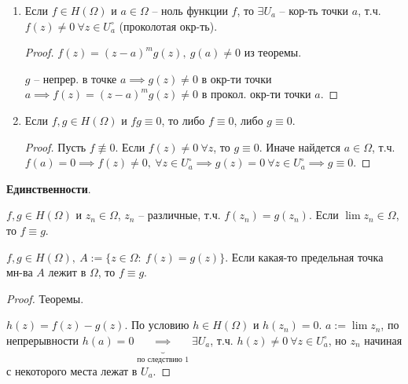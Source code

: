 \begin{consequence}
    \begin{enumerate}
        \item {
            Если $f \in H(\Omega)$ и $a \in \Omega$ -- ноль функции $f$, то $\exists U_a$ -- кор-ть точки $a$, т.ч. $f(z) \not = 0 \ \forall z \in U^{\circ}_a$ (проколотая окр-ть).

            \begin{proof}
                $f(z) = (z - a)^m g(z), \ g(a) \not = 0$ из теоремы.

                $g$ -- непрер. в точке $a \implies g(z) \not = 0$ в окр-ти точки $a \implies f(z) = (z - a)^m g(z) \not = 0$ в прокол. окр-ти точки $a$.
            \end{proof}
        }
        \item {
            Если $f, g \in H(\Omega)$ и $f g \equiv 0$, то либо $f \equiv 0$, либо $g \equiv 0$.

            \begin{proof}
                Пусть $f \not \equiv 0$. Если $f(z) \not = 0 \ \forall z$, то $g \equiv 0$. Иначе найдется $a \in \Omega$, т.ч. $f(a) = 0 \implies f(z) \not = 0, \ \forall z \in U^{\circ}_a \implies g(z) = 0 \ \forall z \in U^{\circ}_a \implies g \equiv 0$.
            \end{proof}
        }
    \end{enumerate}
\end{consequence}


\begin{theorem}
    \textbf{Единственности}.

    $f, g \in H(\Omega)$ и $z_n \in \Omega$, $z_n$ -- различные, т.ч. $f(z_n) = g(z_n)$. Если $\lim {z_n} \in \Omega$, то $f \equiv g$.
\end{theorem}

\begin{consequence}
    $f, g \in H(\Omega), \ A := \{ z \in \Omega: \ f(z) = g(z) \}$. Если какая-то предельная точка мн-ва $A$ лежит в $\Omega$, то $f \equiv g$.
\end{consequence}

\begin{proof}
    Теоремы.

    $h(z) = f(z) - g(z)$. По условию $h \in H(\Omega)$ и $h(z_n) = 0$. $a := \lim{z_n}$, по непрерывности $h(a) = 0 \underbrace{\implies}_{\text{по следствию 1}} \exists U_a$, т.ч. $h(z) \not = 0 \ \forall z \in U^{\circ}_a$, но $z_n$ начиная с некоторого места лежат в $U_a$. 
\end{proof}




